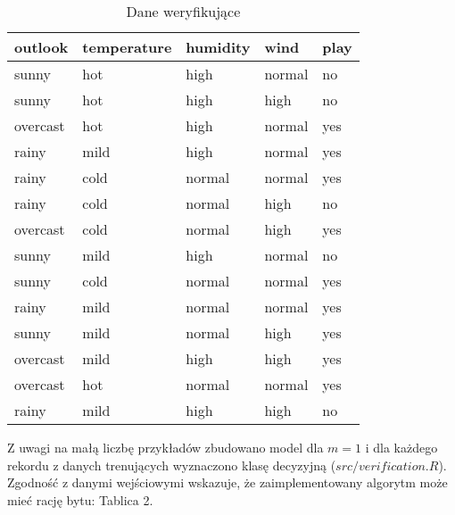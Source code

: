 \documentclass[16]{article}
\begin{document}
\begin{table}[ht]
\begin{center}
\begin{tabular}{|l|l|l|l|l|}
\hline
\textbf{outlook} & \textbf{temperature} & \textbf{humidity} & \textbf{wind} & \textbf{play}
\\ \hline
sunny & hot & high & normal & no
\\ \hline
sunny & hot & high & high & no
\\ \hline
overcast & hot & high & normal & yes
\\ \hline
rainy & mild & high & normal & yes
\\ \hline
rainy & cold & normal & normal & yes
\\ \hline
rainy & cold & normal & high & no
\\ \hline
overcast & cold & normal & high & yes
\\ \hline
sunny & mild & high & normal & no
\\ \hline
sunny & cold & normal & normal & yes
\\ \hline
rainy & mild & normal & normal & yes
\\ \hline
sunny & mild & normal & high & yes
\\ \hline
overcast & mild & high & high & yes
\\ \hline
overcast & hot & normal & normal & yes
\\ \hline
rainy & mild & high & high & no
\\ \hline
\end{tabular}
\caption{Dane weryfikujące}
\end{center}
\end{table}
Z uwagi na małą liczbę przykładów zbudowano model dla $m = 1$ i dla każdego rekordu z danych trenujących wyznaczono klasę decyzyjną ($src/verification.R$). Zgodność z danymi wejściowymi wskazuje, że zaimplementowany algorytm może mieć rację bytu: Tablica 2.
\end{document}
